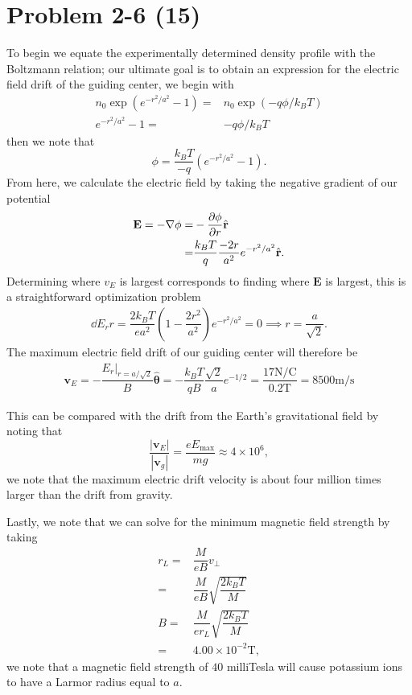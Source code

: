 \section*{Problem 2-6 (15)}
\label{sec:2-6}
To begin we equate the experimentally determined density profile with the Boltzmann relation; our ultimate goal is to obtain an expression for the electric field drift of the guiding center, we begin with
\begin{align*}
	n_0\exp(e^{-r^2/a^2} - 1) =& n_0\exp(-q\phi/k_BT)\\
	e^{-r^2/a^2} - 1 =& -q\phi/k_BT
\end{align*}
then we note that
\begin{equation*}
	\phi = \dfrac{k_BT}{-q}\left(e^{-r^2/a^2}-1\right).
\end{equation*}
From here, we calculate the electric field by taking the negative gradient of our potential
\begin{align*}
	\textbf{E} = -\nabla \phi =& -\frac{\partial \phi}{\partial r}\hat{\textbf{r}} \\
	=& \dfrac{k_BT}{q} \dfrac{-2r}{a^2} e^{-r^2/a^2} \hat{\textbf{r}}.
\end{align*}
Determining where \(v_E\) is largest corresponds to finding where \(\textbf{E}\) is largest, this is a straightforward optimization problem
\begin{align*}
	\dd{E_r}{r} = \dfrac{2k_BT}{ea^2}\left(1 - \dfrac{2r^2}{a^2} \right)e^{-r^2/a^2} = 0 \implies r = \dfrac{a}{\sqrt{2}}.
\end{align*}
The maximum electric field drift of our guiding center will therefore be
\begin{align*}
	\textbf{v}_E = -\dfrac{E_r|_{r = a/\sqrt{2}}}{B} \hat{\bm{\theta}} = -\dfrac{k_BT}{qB}\dfrac{\sqrt{2}}{a}e^{-1/2} = \dfrac{17\text{N}/\text{C}}{0.2\text{T}} = 8500\text{m/s}
\end{align*}

This can be compared with the drift from the Earth's gravitational field by noting that 
\begin{equation*}
	\dfrac{|\textbf{v}_E|}{|\textbf{v}_g|} = \dfrac{eE_\text{max}}{mg} \approx 4\times 10^6,
\end{equation*}
we note that the maximum electric drift velocity is about four million times larger than the drift from gravity.

Lastly, we note that we can solve for the minimum magnetic field strength by taking
\begin{align*}
	r_L =& \dfrac{M}{eB} v_\perp \\
		=& \dfrac{M}{eB} \sqrt{\dfrac{2k_BT}{M}} \\
	B	=& \dfrac{M}{er_L} \sqrt{\dfrac{2k_BT}{M}} \\
	=& 4.00 \times 10^{-2}\text{T},
\end{align*}
we note that a magnetic field strength of \(40\) milliTesla will cause potassium ions to have a Larmor radius equal to \(a\).

